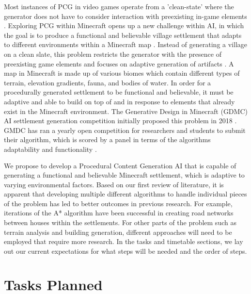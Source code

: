 \documentclass[11pt, oneside]{article}
\begin{document}
\begin{normalsize}
Most instances of PCG in video games operate from a 'clean-state' where the generator does not have to consider interaction with preexisting in-game elements \cite{green_organic_2019}. Exploring PCG within Minecraft opens up a new challenge within AI, in which the goal is to produce a functional and believable village settlement that adapts to different environments within a Minecraft map \cite{salge_generative_2019}. Instead of generating a village on a clean slate, this problem restricts the generator with the presence of preexisting game elements and focuses on adaptive generation of artifacts \cite{green_organic_2019}. A map in Minecraft is made up of various biomes which contain different types of terrain, elevation gradients, fauna, and bodies of water. In order for a procedurally generated settlement to be functional and believable, it must be adaptive and able to build on top of and in response to elements that already exist in the Minecraft environment. The Generative Design in Minecraft (GDMC) AI settlement generation competition initially proposed this problem in 2018 \cite{salge_generative_2018}. GMDC has ran a yearly open competition for researchers and students to submit their algorithm, which is scored by a panel in terms of the algorithms adaptability and functionality \cite{fridh_settlement_nodate}. 

We propose to develop a Procedural Content Generation AI that is capable of generating a functional and believable Minecraft settlement, which is adaptive to varying environmental factors. Based on our first review of literature, it is apparent that developing multiple different algorithms to handle individual pieces of the problem has led to better outcomes in previous research. For example, iterations of the A* algorithm have been successful in creating road networks between houses within the settlements. For other parts of the problem such as terrain analysis and building generation, different approaches will need to be employed that require more research. In the tasks and timetable sections, we lay out our current expectations for what steps will be needed and the order of steps.

\end{normalsize}


\newpage


\section{Tasks Planned}
\label{tasksPlanned}
\end{document}
